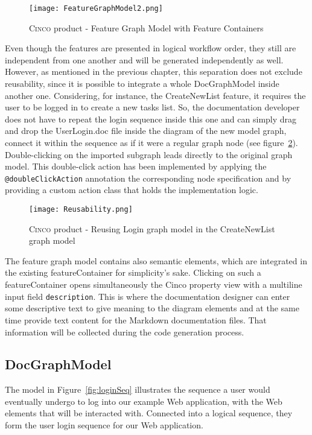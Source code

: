 \begin{figure}[H]
    \centering
    \texttt{[image: FeatureGraphModel2.png]}
    \caption{\textsc{Cinco} product - Feature Graph Model with Feature Containers}
    \label{fig:featGraph}
\end{figure}

Even though the features are presented in logical workflow order, they still are independent from one another and will be generated independently as well. However, as mentioned in the previous chapter, this separation does not exclude reusability, since it is possible to integrate a whole DocGraphModel inside another one. Considering, for instance, the CreateNewList feature, it requires the user to be logged in to create a new tasks list. So, the documentation developer does not have to repeat the login sequence inside this one and can simply drag and drop the UserLogin.doc file inside the diagram of the new model graph, connect it within the sequence as if it were a regular graph node (see figure~\ref{fig:reusability}). Double-clicking on the imported subgraph leads directly to the original graph model. This double-click action has been implemented by applying the \lstinline[language=MGL]{@doubleClickAction} annotation the corresponding node specification and by providing a custom action class that holds the implementation logic.

\begin{figure}[h]
    \centering
    \texttt{[image: Reusability.png]}
    \caption{\textsc{Cinco} product - Reusing Login graph model in the CreateNewList graph model}
    \label{fig:reusability}
\end{figure}

The feature graph model contains also semantic elements, which are integrated in the existing featureContainer for simplicity's sake. Clicking on such a featureContainer opens simultaneously the Cinco property view with a multiline input field \lstinline{description}. This is where the documentation designer can enter some descriptive text to give meaning to the diagram elements and at the same time provide text content for the Markdown documentation files. That information will be collected during the code generation process.

\subsection{DocGraphModel}\label{sec:DocGrahpModElem}

The model in Figure~\ref{fig:loginSeq} illustrates the sequence a user would eventually undergo to log into our example Web application, with the Web elements that will be interacted with. Connected into a logical sequence, they form the user login sequence for our Web application. 

